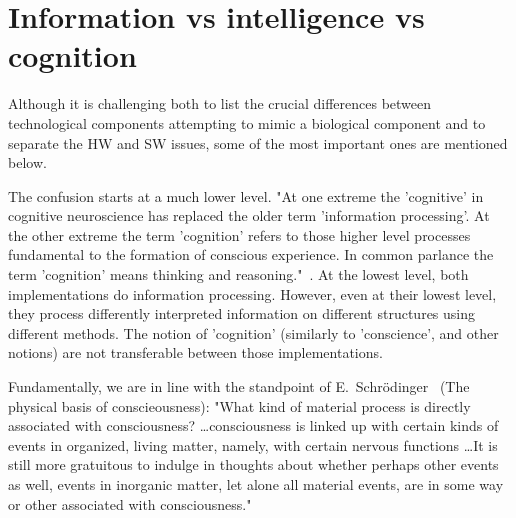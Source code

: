 \section[Cognition]{Information vs intelligence vs cognition \label{sec:Information-Cognition}}



Although it is challenging both to list the crucial differences between technological components attempting to mimic a biological component and to separate the
\gls{HW}
and \gls{SW}
issues, some of the most important ones are mentioned below. 

The confusion starts at a much lower level. "At one extreme the 'cognitive' in cognitive neuroscience has replaced the older term 'information processing'.
At the other extreme the term 'cognition' refers to those higher level processes fundamental to the formation of conscious experience.
In common parlance the term 'cognition' means thinking and reasoning."~\cite{PrinciplesNeuralScience:2013}.
At the lowest level, both implementations do information processing.
However, even at their lowest level, they process differently interpreted information on different structures using different methods.
The notion of 'cognition' (similarly to 'conscience', and other notions) are not transferable between those implementations.

Fundamentally, we are in line with the standpoint of E.~Schrödinger~\cite{Schrodinger:1992} (The physical basis of conscieousness):
"What kind of material process is directly associated with consciousness? \dots consciousness is linked up with certain kinds of events in organized, living matter, namely, with certain nervous functions \dots It is still more gratuitous to indulge in thoughts about whether perhaps other events as well, events in inorganic matter, let alone all material events, are in some way or other associated with consciousness."


